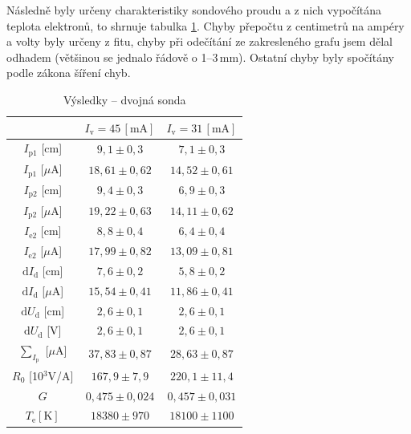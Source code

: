 \documentclass[12pt]{article}
\begin{document}
Následně byly určeny charakteristiky sondového proudu a z nich vypočítána teplota elektronů, to shrnuje tabulka \ref{vysledkydvojna}. Chyby přepočtu z centimetrů na ampéry a volty byly určeny z fitu, chyby při odečítání ze zakresleného grafu jsem dělal odhadem (většinou se jednalo řádově o 1--3\,mm). Ostatní chyby byly spočítány podle zákona šíření chyb.

\begin{table}[htbp]
\begin{center}
\begin{tabular}{|c|c|c|}
\hline
 & $I_\mathrm{v} = 45\,[\mathrm{mA}]$ & $I_\mathrm{v} = 31\,[\mathrm{mA}]$ \\ \hline
$I_\mathrm{p1}$ [cm] & $9,1 \pm	0,3$ & $7,1 \pm 0,3 $\\ \hline
$I_\mathrm{p1}$ [$\mu$A] &	$18,61 \pm	0,62$ & $ 14,52 \pm 0,61 $\\ \hline
$I_\mathrm{p2}$ [cm] & $9,4 \pm	0,3$ & $ 6,9 \pm 0,3 $ \\ \hline
$I_\mathrm{p2}$ [$\mu$A] & $19,22 \pm 0,63$ & $  14,11 \pm 0,62 $ \\ \hline
$I_\mathrm{e2}$ [cm] & $8,8 \pm 0,4$ & $ 6,4 \pm 0,4 $ \\ \hline
$I_\mathrm{e2}$ [$\mu$A] & $17,99 \pm 0,82$ & $ 13,09 \pm 0,81 $ \\ \hline
$\mathrm{d}I_\mathrm{d}$ [cm] & $7,6 \pm 0,2$ & $ 5,8 \pm 0,2 $ \\ \hline			
$\mathrm{d}I_\mathrm{d}$ [$\mu$A] & $15,54 \pm 0,41$ & $ 11,86 \pm 0,41 $ \\ \hline
$\mathrm{d}U_\mathrm{d}$ [cm] & $2,6 \pm 0,1$ & $ 2,6 \pm 0,1 $ \\ \hline
$\mathrm{d}U_\mathrm{d}$ [V] & $2,6 \pm 0,1$ & $ 2,6 \pm 0,1 $ \\ \hline
$\sum_{I_\mathrm{p}}$ [$\mu$A] & $37,83 \pm 0,87$ & $28,63 \pm 0,87$ \\ \hline
$R_0$ [10$^3$V/A] &	$167,9 \pm 7,9$ & $220,1 \pm 11,4$ \\ \hline
$G$ & $0,475 \pm 0,024$ & $0,457 \pm 0,031$ \\ \hline
\boldmath$T_\mathrm{e} [\mathrm{K}]$ & \boldmath$18380 \pm 970$ & \boldmath$18100 \pm 1100$ \\ \hline
\end{tabular}
\end{center}
\caption{Výsledky -- dvojná sonda}
\label{vysledkydvojna}
\end{table}
\end{document}
